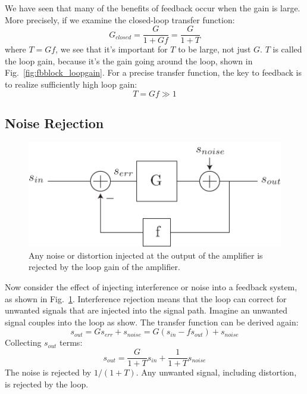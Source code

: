 We have seen that many of the benefits of feedback occur when the gain is large.  More precisely, if we examine the closed-loop transfer function:
%
\begin{equation}
	{G_{closed}} = \frac{G}{{1 + Gf}} = \frac{G}{{1 + T}}
\end{equation}
%
where $T = Gf$, we see that it's important for $T$ to be large, not just $G$.  $T$ is called the loop gain, because it's the gain going around the loop, shown in Fig.~\ref{fig:fbblock_loopgain}.  For a precise transfer function, the key to feedback is to realize sufficiently high loop gain:
\begin{equation}
	T = Gf \gg 1
\end{equation}


\subsection{Noise Rejection}

\begin{figure}[tb]
\begin{center}
\includegraphics[scale=.7]{fbblock_noise}
\end{center}
\caption{Any noise or distortion injected at the output of the amplifier is rejected by the loop gain of the amplifier.} \label{fig:fbblock_noise}
\end{figure}

Now consider the effect of injecting interference or noise into a feedback system, as shown in Fig.~\ref{fig:fbblock_noise}. Interference rejection means that the loop can correct for unwanted signals that are injected into the signal path.  Imagine an unwanted signal couples into the loop as show.  The transfer function can be derived again:
%
\begin{equation}
	{s_{out}} = G{s_{err}} + {s_{noise}} = G({s_{in}} - f{s_{out}}) + {s_{noise}}
\end{equation}
%
Collecting $s_{out}$ terms:
% 
\begin{equation}
	{s_{out}} = \frac{G}{{1 + T}}{s_{in}} + \frac{1}{{1 + T}}{s_{noise}}
\end{equation}
%
The noise is rejected by $1/(1+T)$. Any unwanted signal, including distortion, is rejected by the loop.





